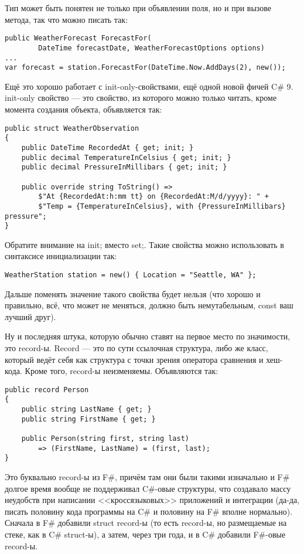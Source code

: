 \documentclass{../../text-style}
\begin{document}
Тип может быть понятен не только при объявлении поля, но и при вызове метода, так что можно писать так:

\begin{verbatim}
public WeatherForecast ForecastFor(
        DateTime forecastDate, WeatherForecastOptions options)
...
var forecast = station.ForecastFor(DateTime.Now.AddDays(2), new());
\end{verbatim}


Ещё это хорошо работает с init-only-свойствами, ещё одной новой фичей C\# 9. init-only свойство --- это свойство, из которого можно только читать, кроме момента создания объекта, объявляется так:

\begin{verbatim}
public struct WeatherObservation
{
    public DateTime RecordedAt { get; init; }
    public decimal TemperatureInCelsius { get; init; }
    public decimal PressureInMillibars { get; init; }

    public override string ToString() =>
        $"At {RecordedAt:h:mm tt} on {RecordedAt:M/d/yyyy}: " +
        $"Temp = {TemperatureInCelsius}, with {PressureInMillibars} pressure";
}
\end{verbatim}

Обратите внимание на init; вместо set;. Такие свойства можно использовать в синтаксисе инициализации так:

\begin{verbatim}
WeatherStation station = new() { Location = "Seattle, WA" };
\end{verbatim}

Дальше поменять значение такого свойства будет нельзя (что хорошо и правильно, всё, что может не меняться, должно быть немутабельным, const ваш лучший друг).

Ну и последняя штука, которую обычно ставят на первое место по значимости, это record-ы. Record --- это по сути ссылочная структура, либо же класс, который ведёт себя как структура с точки зрения оператора сравнения и хеш-кода. Кроме того, record-ы неизменяемы. Объявляются так:

\begin{verbatim}
public record Person
{
    public string LastName { get; }
    public string FirstName { get; }

    public Person(string first, string last) 
        => (FirstName, LastName) = (first, last);
}
\end{verbatim}

Это буквально record-ы из F\#, причём там они были такими изначально и F\# долгое время вообще не поддерживал C\#-овые структуры, что создавало массу неудобств при написании <<кроссязыковых>> приложений и интеграции (да-да, писать половину кода программы на C\# и половину на F\# вполне нормально). Сначала в F\# добавили struct record-ы (то есть record-ы, но размещаемые на стеке, как в C\# struct-ы), а затем, через три года, и в C\# добавили F\#-овые record-ы.
\end{document}
